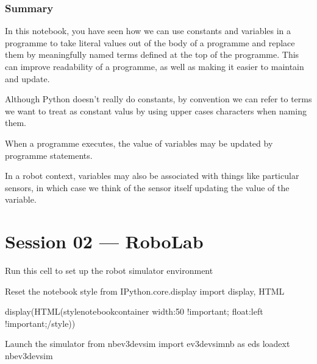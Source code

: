 \documentclass[letterpaper,10pt,english]{sphinxmanual}
\begin{document}
{


\subsubsection{Summary}
\label{\detokenize{content/01_Robot_Lab/Section_00_02:Summary}}
In this notebook, you have seen how we can use constants and variables in a programme to take literal values out of the body of a programme and replace them by meaningfully named terms defined at the top of the programme. This can improve readability of a programme, as well as making it easier to maintain and update.

Although Python doesn’t really do constants, by convention we can refer to terms we want to treat as constant valus by using upper cases characters when naming them.

When a programme executes, the value of variables may be updated by programme statements.

In a robot context, variables may also be associated with things like particular sensors, in which case we think of the sensor itself updating the value of the variable.


\section{Session 02 — RoboLab}
\label{\detokenize{index:session-02-robolab}}
{
\begin{sphinxVerbatim}[commandchars=\\\{\}]
\llap{\color{nbsphinxin}[ ]:\,\hspace{\fboxrule}\hspace{\fboxsep}}\PYGZsh{} Run this cell to set up the robot simulator environment

\PYGZsh{}Reset the notebook style
from IPython.core.display import display, HTML

display(HTML(\PYGZdq{}\PYGZlt{}style\PYGZgt{}\PYGZsh{}notebook\PYGZhy{}container \PYGZob{} width:50\PYGZpc{} !important; float:left !important;\PYGZcb{}\PYGZlt{}/style\PYGZgt{}\PYGZdq{}))


\PYGZsh{}Launch the simulator
from nbev3devsim import ev3devsim\PYGZus{}nb as eds
\PYGZpc{}load\PYGZus{}ext nbev3devsim


\end{sphinxVerbatim}}}
\end{document}
